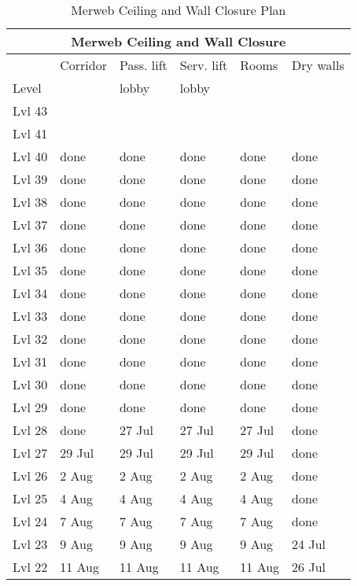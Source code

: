 \newcommand{\done}{\cellcolor[gray]{0.9}done}  %
\small
\begin{table}[htbp]
\caption{Merweb Ceiling and Wall Closure Plan}
\begin{tabular}{llllll}
\toprule 
\multicolumn{6}{c}{\bf Merweb Ceiling and Wall Closure}\\
\midrule
~        & Corridor & Pass. lift  & Serv. lift  & Rooms   & Dry walls \\
Level   &            & lobby             &lobby    &    &              \\ 
\midrule
Lvl 43  &             &                &                &             &              \\
Lvl 41  &             &              &         &     &        \\
Lvl 40  & \done     &\done&\done&\done&\done\\
Lvl 39  & \done     &\done&\done&\done&\done\\
Lvl 38  & \done     &\done&\done&\done&\done\\
Lvl 37  & \done     &\done&\done&\done&\done\\
Lvl 36  & \done     &\done&\done&\done&\done\\
Lvl 35  & \done     &\done&\done&\done&\done\\
Lvl 34  & \done     &\done&\done&\done&\done\\
Lvl 33  & \done     &\done&\done&\done&\done\\
Lvl 32  & \done     &\done&\done&\done&\done\\
Lvl 31  & \done     &\done&\done&\done&\done\\
Lvl 30  & \done     &\done&\done&\done&\done\\
Lvl 29  & \done     &\done&\done&\done&\done\\
Lvl 28  & \done     & 27 Jul          &27 Jul         &27 Jul        &\done\\
Lvl 27  & 29 Jul    & 29 Jul   &29 Jul         &29 Jul         &\done \\
Lvl 26  & 2 Aug    & 2 Aug  & 2 Aug        &2 Aug         &\done \\
Lvl 25  & 4 Aug    & 4 Aug  & 4 Aug        &4 Aug         &\done \\
Lvl 24  & 7 Aug    & 7 Aug  & 7 Aug        &7 Aug         &\done \\
Lvl 23  & 9 Aug    & 9 Aug  & 9 Aug        &9 Aug         & 24 Jul\\
Lvl 22  & 11 Aug   &11 Aug & 11 Aug        &11 Aug         &26 Jul\\

\end{tabular}
\end{table}
